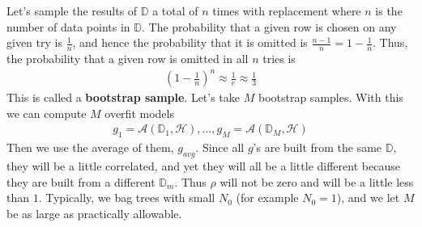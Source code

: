\documentclass[12pt, a4paper]{article}
\theoremstyle{definition}
\begin{document}
	Let's sample the results of $\mathbb{D}$ a total of $n$ times with replacement
	where $n$ is the number of data points in $\mathbb{D}$.
	The probability that a given row is chosen on any given try is
	$\frac{1}{n}$, and hence the probability that it is omitted is
	$\frac{n-1}{n}=1-\frac{1}{n}$. Thus, the probability that a given
	row is omitted in all $n$ tries is
	\begin{align*}
		\left(1 - \frac{1}{n}\right)^n\approx \frac{1}{e}\approx \frac{1}{3}
	\end{align*}
	This is called a \textbf{bootstrap sample}. Let's take $M$ bootstrap samples.
	With this we can compute $M$ overfit models
	\begin{align*}
		g_1 = \mathcal{A}(\mathbb{D}_1,\mathcal{H}),\ldots,
		g_M = \mathcal{A}(\mathbb{D}_M, \mathcal{H})
	\end{align*}
	Then we use the average of them, $g_{avg}$. Since all $g$'s are built
	from the same $\mathbb{D}$, they will be a little correlated, and yet
	they will all be a little different because they are built from a different
	$\mathbb{D}_m$. Thus $\rho$ will not be zero and will be a little less
	than $1$. Typically, we bag trees with small $N_0$ (for example $N_0 = 1$),
	and we let $M$ be as large as practically allowable.
\end{document}
